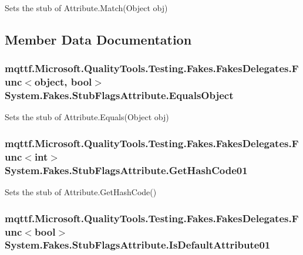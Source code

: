 Sets the stub of Attribute.\-Match(\-Object obj)



\subsection{Member Data Documentation}
\hypertarget{class_system_1_1_fakes_1_1_stub_flags_attribute_a5a8fc03a3327a7e8287e303a9d80159a}{
\subsubsection[{Equals\-Object}]{\setlength{\rightskip}{0pt plus 5cm}mqttf.\-Microsoft.\-Quality\-Tools.\-Testing.\-Fakes.\-Fakes\-Delegates.\-Func$<$object, bool$>$ System.\-Fakes.\-Stub\-Flags\-Attribute.\-Equals\-Object}}\label{class_system_1_1_fakes_1_1_stub_flags_attribute_a5a8fc03a3327a7e8287e303a9d80159a}


Sets the stub of Attribute.\-Equals(\-Object obj)

\hypertarget{class_system_1_1_fakes_1_1_stub_flags_attribute_a219787ee73e5ab44172d6ac5ec2ca378}{
\subsubsection[{Get\-Hash\-Code01}]{\setlength{\rightskip}{0pt plus 5cm}mqttf.\-Microsoft.\-Quality\-Tools.\-Testing.\-Fakes.\-Fakes\-Delegates.\-Func$<$int$>$ System.\-Fakes.\-Stub\-Flags\-Attribute.\-Get\-Hash\-Code01}}\label{class_system_1_1_fakes_1_1_stub_flags_attribute_a219787ee73e5ab44172d6ac5ec2ca378}


Sets the stub of Attribute.\-Get\-Hash\-Code()

\hypertarget{class_system_1_1_fakes_1_1_stub_flags_attribute_a64f4dbca5be6936b5517ea3f16b9cfeb}{
\subsubsection[{Is\-Default\-Attribute01}]{\setlength{\rightskip}{0pt plus 5cm}mqttf.\-Microsoft.\-Quality\-Tools.\-Testing.\-Fakes.\-Fakes\-Delegates.\-Func$<$bool$>$ System.\-Fakes.\-Stub\-Flags\-Attribute.\-Is\-Default\-Attribute01}}\label{class_system_1_1_fakes_1_1_stub_flags_attribute_a64f4dbca5be6936b5517ea3f16b9cfeb}



